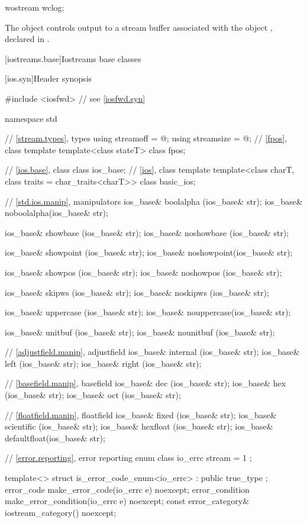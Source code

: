 %
\begin{itemdecl}
wostream wclog;
\end{itemdecl}

\begin{itemdescr}
\pnum
The object 
controls output to a stream buffer associated with the object ,
declared in .
\end{itemdescr}

[iostreams.base]{Iostreams base classes}

[ios.syn]{Header  synopsis}

%
%
\begin{codeblock}
#include <iosfwd>   // see \ref{iosfwd.syn}

namespace std {
  // \ref{stream.types}, types
  using streamoff  = @\impdef@;
  using streamsize = @\impdef@;
  // \ref{fpos}, class template 
  template<class stateT> class fpos;

  // \ref{ios.base}, class 
  class ios_base;
  // \ref{ios}, class template 
  template<class charT, class traits = char_traits<charT>>
    class basic_ios;

  // \ref{std.ios.manip}, manipulators
  ios_base& boolalpha  (ios_base& str);
  ios_base& noboolalpha(ios_base& str);

  ios_base& showbase   (ios_base& str);
  ios_base& noshowbase (ios_base& str);

  ios_base& showpoint  (ios_base& str);
  ios_base& noshowpoint(ios_base& str);

  ios_base& showpos    (ios_base& str);
  ios_base& noshowpos  (ios_base& str);

  ios_base& skipws     (ios_base& str);
  ios_base& noskipws   (ios_base& str);

  ios_base& uppercase  (ios_base& str);
  ios_base& nouppercase(ios_base& str);

  ios_base& unitbuf    (ios_base& str);
  ios_base& nounitbuf  (ios_base& str);

  // \ref{adjustfield.manip}, adjustfield
  ios_base& internal   (ios_base& str);
  ios_base& left       (ios_base& str);
  ios_base& right      (ios_base& str);

  // \ref{basefield.manip}, basefield
  ios_base& dec        (ios_base& str);
  ios_base& hex        (ios_base& str);
  ios_base& oct        (ios_base& str);

  // \ref{floatfield.manip}, floatfield
  ios_base& fixed      (ios_base& str);
  ios_base& scientific (ios_base& str);
  ios_base& hexfloat   (ios_base& str);
  ios_base& defaultfloat(ios_base& str);

  // \ref{error.reporting}, error reporting
  enum class io_errc {
    stream = 1
  };

  template<> struct is_error_code_enum<io_errc> : public true_type { };
  error_code make_error_code(io_errc e) noexcept;
  error_condition make_error_condition(io_errc e) noexcept;
  const error_category& iostream_category() noexcept;
}
\end{codeblock}
